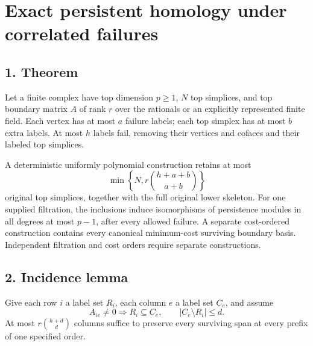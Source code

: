 
\hypertarget{af-ca17aac320-exact-persistent-homology-under-correlated-failures}{%
\section{Exact persistent homology under correlated failures}\label{af-ca17aac320-exact-persistent-homology-under-correlated-failures}}

\hypertarget{af-ca17aac320-theorem}{%
\subsection{1. Theorem}\label{af-ca17aac320-theorem}}

Let a finite complex have top dimension \(p\ge1\), \(N\) top simplices, and top boundary matrix \(A\) of rank \(r\) over the rationals or an explicitly represented finite field. Each vertex has at most \(a\) failure labels; each top simplex has at most \(b\) extra labels. At most \(h\) labels fail, removing their vertices and cofaces and their labeled top simplices.

A deterministic uniformly polynomial construction retains at most \[
\min\left\{N,r\binom{h+a+b}{a+b}\right\}
\] original top simplices, together with the full original lower skeleton. For one supplied filtration, the inclusions induce isomorphisms of persistence modules in all degrees at most \(p-1\), after every allowed failure. A separate cost-ordered construction contains every canonical minimum-cost surviving boundary basis. Independent filtration and cost orders require separate constructions.

\hypertarget{af-ca17aac320-incidence-lemma}{%
\subsection{2. Incidence lemma}\label{af-ca17aac320-incidence-lemma}}

Give each row \(i\) a label set \(R_i\), each column \(e\) a label set \(C_e\), and assume \[
A_{ie}\ne0\Longrightarrow R_i\subseteq C_e,\qquad |C_e\setminus R_i|\le d.
\] At most \(r\binom{h+d}{d}\) columns suffice to preserve every surviving span at every prefix of one specified order.

